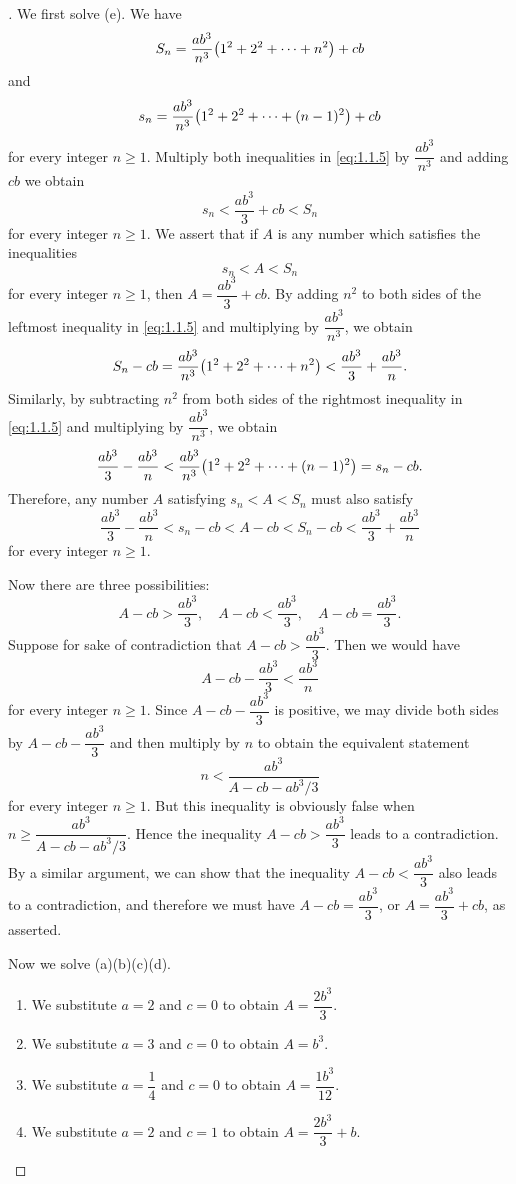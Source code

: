 \begin{proof}[]
  We first solve (e).
  We have
  \[
    S_n = \dfrac{a b^3}{n^3} \pa{1^2 + 2^2 + \dots + n^2} + cb
  \]
  and
  \[
    s_n = \dfrac{a b^3}{n^3} \pa{1^2 + 2^2 + \dots + (n - 1)^2} + cb
  \]
  for every integer \(n \geq 1\).
  Multiply both inequalities in \cref{eq:1.1.5} by \(\dfrac{a b^3}{n^3}\) and adding \(cb\) we obtain
  \[
    s_n < \dfrac{a b^3}{3} + cb < S_n
  \]
  for every integer \(n \geq 1\).
  We assert that if \(A\) is any number which satisfies the inequalities
  \[
    s_n < A < S_n
  \]
  for every integer \(n \geq 1\), then \(A = \dfrac{a b^3}{3} + cb\).
  By adding \(n^2\) to both sides of the leftmost inequality in \cref{eq:1.1.5} and multiplying by \(\dfrac{a b^3}{n^3}\), we obtain
  \[
    S_n - cb = \dfrac{a b^3}{n^3} \pa{1^2 + 2^2 + \dots + n^2} < \dfrac{a b^3}{3} + \dfrac{a b^3}{n}.
  \]
  Similarly, by subtracting \(n^2\) from both sides of the rightmost inequality in \cref{eq:1.1.5} and multiplying by \(\dfrac{a b^3}{n^3}\), we obtain
  \[
    \dfrac{a b^3}{3} - \dfrac{a b^3}{n} < \dfrac{a b^3}{n^3} \pa{1^2 + 2^2 + \dots + (n - 1)^2} = s_n - cb.
  \]
  Therefore, any number \(A\) satisfying \(s_n < A < S_n\) must also satisfy
  \[
    \dfrac{a b^3}{3} - \dfrac{a b^3}{n} < s_n - cb < A - cb < S_n - cb < \dfrac{a b^3}{3} + \dfrac{a b^3}{n}
  \]
  for every integer \(n \geq 1\).

  Now there are three possibilities:
  \[
    A - cb > \dfrac{a b^3}{3}, \quad A - cb < \dfrac{a b^3}{3}, \quad A - cb = \dfrac{a b^3}{3}.
  \]
  Suppose for sake of contradiction that \(A - cb > \dfrac{a b^3}{3}\).
  Then we would have
  \[
    A - cb - \dfrac{a b^3}{3} < \dfrac{a b^3}{n}
  \]
  for every integer \(n \geq 1\).
  Since \(A - cb - \dfrac{a b^3}{3}\) is positive, we may divide both sides by \(A - cb - \dfrac{a b^3}{3}\) and then multiply by \(n\) to obtain the equivalent statement
  \[
    n < \dfrac{a b^3}{A - cb - a b^3 / 3}
  \]
  for every integer \(n \geq 1\).
  But this inequality is obviously false when \(n \geq \dfrac{a b^3}{A - cb - a b^3 / 3}\).
  Hence the inequality \(A - cb > \dfrac{a b^3}{3}\) leads to a contradiction.
  By a similar argument, we can show that the inequality \(A - cb < \dfrac{a b^3}{3}\) also leads to a contradiction, and therefore we must have \(A - cb = \dfrac{a b^3}{3}\), or \(A = \dfrac{a b^3}{3} + cb\), as asserted.

  Now we solve (a)(b)(c)(d).
  \begin{enumerate}
    \item We substitute \(a = 2\) and \(c = 0\) to obtain \(A = \dfrac{2 b^3}{3}\).
    \item We substitute \(a = 3\) and \(c = 0\) to obtain \(A = b^3\).
    \item We substitute \(a = \dfrac{1}{4}\) and \(c = 0\) to obtain \(A = \dfrac{1 b^3}{12}\).
    \item We substitute \(a = 2\) and \(c = 1\) to obtain \(A = \dfrac{2 b^3}{3} + b\).
  \end{enumerate}
\end{proof}


